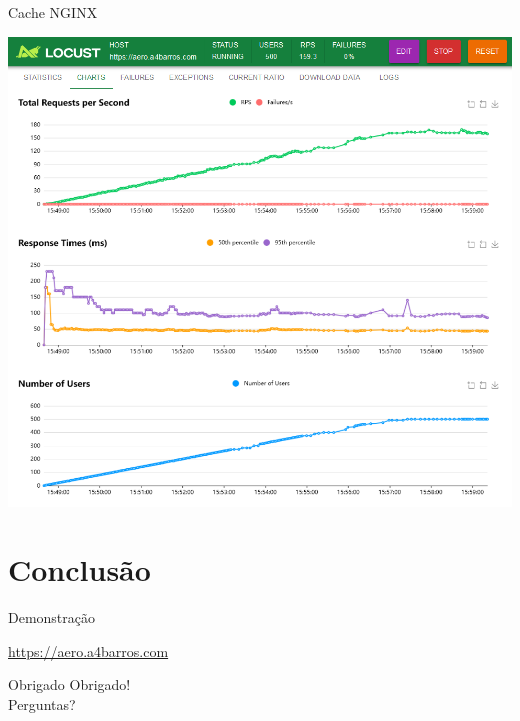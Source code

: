 \documentclass{beamer}
\begin{document}
\begin{frame}{Cache NGINX}
    \pause
    \begin{center}
    \includegraphics[width=0.8\linewidth]{img/locust-cache.png}
    \end{center}
\end{frame}


\section{Conclusão}
\begin{frame}{Demonstração}
    \begin{center}
        \url{https://aero.a4barros.com}
    \end{center}
\end{frame}

\begin{frame}{Obrigado}
    \centering
    \Huge Obrigado! \\
    \normalsize Perguntas?
\end{frame}
\end{document}
